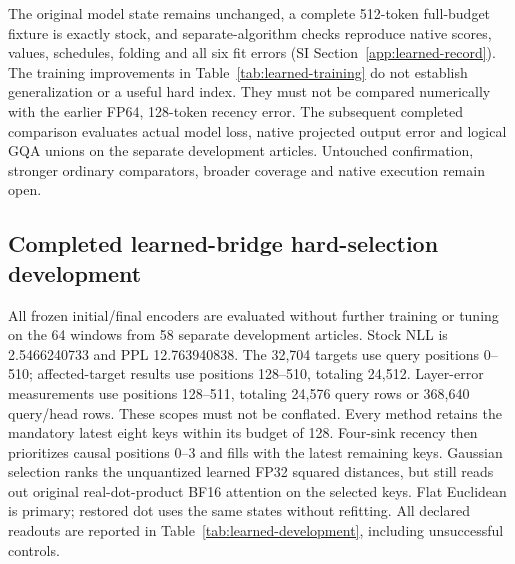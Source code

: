 \documentclass[11pt]{article}
\begin{document}
The original model state remains unchanged, a complete 512-token full-budget
fixture is exactly stock, and separate-algorithm checks reproduce native
scores, values, schedules, folding and all six fit errors
(SI Section~\ref{app:learned-record}). The training improvements in
Table~\ref{tab:learned-training} do not establish generalization or a useful
hard index. They must not be compared numerically with the earlier FP64,
128-token recency error. The subsequent completed comparison evaluates actual
model loss, native projected output error and logical GQA unions on the
separate development articles. Untouched confirmation, stronger ordinary
comparators, broader coverage and native execution remain open.

\subsection{Completed learned-bridge hard-selection development}
\label{sec:learned-development}

All frozen initial/final encoders are evaluated without further training or
tuning on the 64 windows from 58 separate development articles. Stock NLL is
2.5466240733 and PPL 12.763940838. The 32,704 targets use query positions
0--510; affected-target results use positions 128--510, totaling 24,512.
Layer-error measurements use positions 128--511, totaling 24,576 query rows
or 368,640 query/head rows. These scopes must not be conflated. Every method
retains the mandatory latest eight keys within its budget of 128.
Four-sink recency then prioritizes causal positions 0--3 and fills with the
latest remaining keys. Gaussian selection ranks the unquantized learned
FP32 squared distances, but still reads out original real-dot-product BF16
attention on the selected keys. Flat Euclidean is primary; restored dot
uses the same states without refitting. All declared readouts are reported
in Table~\ref{tab:learned-development}, including unsuccessful controls.
\end{document}
